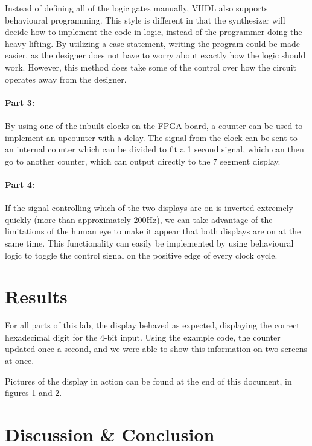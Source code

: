 \documentclass{article}
\begin{document}
Instead of defining all of the logic gates manually, VHDL also supports
behavioural programming.
This style is different in that the synthesizer will decide how to implement
the code in logic, instead of the programmer doing the heavy lifting.
By utilizing a case statement, writing the program could be made easier,
as the designer does not have to worry about exactly how the logic should work.
However, this method does take some of the control over how the circuit operates
away from the designer.

\paragraph{Part 3:}

By using one of the inbuilt clocks on the FPGA board, a counter can be used to implement an
upcounter with a delay.
The signal from the clock can be sent to an internal counter which can
be divided to fit a 1 second signal, which can then go to another counter, which can output directly to
the 7 segment display.

\paragraph{Part 4:}

If the signal controlling which of the two displays are on is inverted 
extremely quickly (more than approximately 200Hz), we can take advantage of the limitations
of the human eye to make it appear that both displays are on at the same time.
This functionality can easily be implemented by using behavioural logic to
toggle the control signal on the positive edge of every clock cycle.

\section{Results}

For all parts of this lab, the display behaved as expected,
displaying the correct hexadecimal digit for the 4-bit input.
Using the example code, the counter updated once a second, and we were able
to show this information on two screens at once.

Pictures of the display in action can be found at the end of this document, in figures 1 and 2.

\section{Discussion \& Conclusion}
\end{document}
